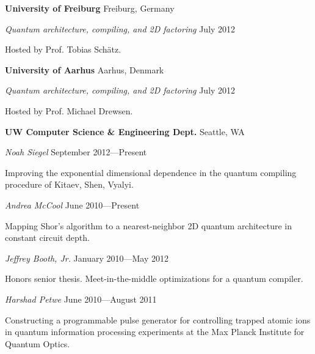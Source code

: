 \documentclass[letter]{article}
\begin{document}
\vspace{\baselineskip}
\par
{\bf {University of Freiburg}} \hfill Freiburg, Germany
\par
{\em Quantum architecture, compiling, and 2D factoring} \hfill July 2012
\par
Hosted by Prof. Tobias Sch\"atz.

\vspace{\baselineskip}
\par
{\bf {University of Aarhus}} \hfill Aarhus, Denmark
\par
{\em Quantum architecture, compiling, and 2D factoring} \hfill July 2012
\par
Hosted by Prof. Michael Drewsen.

\pagebreak

\vspace{\baselineskip}
\par
{\bf {UW Computer Science \& Engineering Dept.}} \hfill Seattle, WA
\par

\vspace{0.5\baselineskip}
\par
\emph{Noah Siegel} \hfill September 2012---Present
\par
Improving the exponential dimensional dependence in the quantum compiling
procedure of Kitaev, Shen, Vyalyi.

\vspace{0.5\baselineskip}
\par
\emph{Andrea McCool} \hfill June 2010---Present
\par
Mapping Shor's algorithm to a nearest-neighbor 2D quantum architecture in
constant circuit depth.

\vspace{0.5\baselineskip}
\par
\emph{Jeffrey Booth, Jr.} \hfill January 2010---May 2012
\par
Honors senior thesis. Meet-in-the-middle optimizations for a quantum compiler.

\vspace{0.5\baselineskip}
\par
\emph{Harshad Petwe} \hfill June 2010---August 2011
\par
Constructing a programmable pulse generator for controlling trapped atomic
ions in quantum information processing experiments at the Max Planck Institute
for Quantum Optics.
\end{document}
